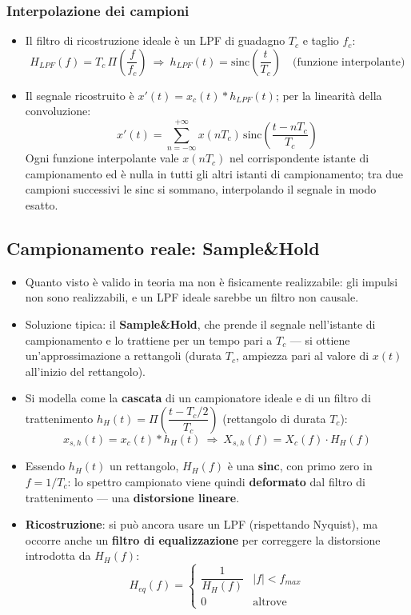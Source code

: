 \documentclass[12pt, a4paper]{article}
\begin{document}
\subsubsection{Interpolazione dei campioni}
\begin{itemize}
    \item Il filtro di ricostruzione ideale è un LPF di guadagno $T_c$ e taglio $f_c$:
    $$H_{LPF}(f) = T_c\,\Pi\!\left(\frac{f}{f_c}\right) \ \Longrightarrow\ h_{LPF}(t) = \text{sinc}\!\left(\frac{t}{T_c}\right) \quad\text{(funzione interpolante)}$$
    \item Il segnale ricostruito è $x'(t)=x_c(t)*h_{LPF}(t)$; per la linearità della convoluzione:
    $$x'(t) = \sum_{n=-\infty}^{+\infty} x(nT_c)\,\text{sinc}\!\left(\frac{t-nT_c}{T_c}\right)$$
    Ogni funzione interpolante vale $x(nT_c)$ nel corrispondente istante di campionamento ed è nulla in tutti gli altri istanti di campionamento; tra due campioni successivi le sinc si sommano, interpolando il segnale in modo esatto.
\end{itemize}

\subsection{Campionamento reale: Sample\&Hold}
\begin{itemize}
    \item Quanto visto è valido in teoria ma non è fisicamente realizzabile: gli impulsi non sono realizzabili, e un LPF ideale sarebbe un filtro non causale.
    \item Soluzione tipica: il \textbf{Sample\&Hold}, che prende il segnale nell'istante di campionamento e lo trattiene per un tempo pari a $T_c$ — si ottiene un'approssimazione a rettangoli (durata $T_c$, ampiezza pari al valore di $x(t)$ all'inizio del rettangolo).
    \item Si modella come la \textbf{cascata} di un campionatore ideale e di un filtro di trattenimento $h_H(t)=\Pi\!\left(\dfrac{t-T_c/2}{T_c}\right)$ (rettangolo di durata $T_c$):
    $$x_{s,h}(t) = x_c(t)*h_H(t) \ \Longrightarrow\ X_{s,h}(f) = X_c(f)\cdot H_H(f)$$
    \item Essendo $h_H(t)$ un rettangolo, $H_H(f)$ è una \textbf{sinc}, con primo zero in $f=1/T_c$: lo spettro campionato viene quindi \textbf{deformato} dal filtro di trattenimento — una \textbf{distorsione lineare}.
    \item \textbf{Ricostruzione}: si può ancora usare un LPF (rispettando Nyquist), ma occorre anche un \textbf{filtro di equalizzazione} per correggere la distorsione introdotta da $H_H(f)$:
    $$H_{eq}(f) = \begin{cases} \dfrac{1}{H_H(f)} & |f|<f_{max} \\ 0 & \text{altrove}\end{cases}$$
\end{itemize}
\end{document}
